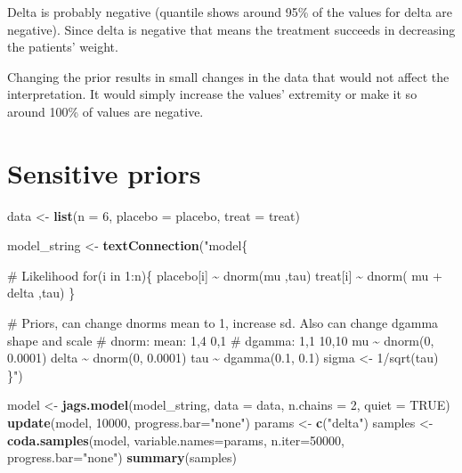 \documentclass[
]{article}
\newenvironment{Shaded}{\begin{snugshade}}{\end{snugshade}}
\newcommand{\AttributeTok}[1]{\textcolor[rgb]{0.13,0.29,0.53}{#1}}
\newcommand{\ConstantTok}[1]{\textcolor[rgb]{0.56,0.35,0.01}{#1}}
\newcommand{\DecValTok}[1]{\textcolor[rgb]{0.00,0.00,0.81}{#1}}
\newcommand{\FunctionTok}[1]{\textcolor[rgb]{0.13,0.29,0.53}{\textbf{#1}}}
\newcommand{\NormalTok}[1]{#1}
\newcommand{\OtherTok}[1]{\textcolor[rgb]{0.56,0.35,0.01}{#1}}
\newcommand{\StringTok}[1]{\textcolor[rgb]{0.31,0.60,0.02}{#1}}
\begin{document}
Delta is probably negative (quantile shows around 95\% of the values for
delta are negative). Since delta is negative that means the treatment
succeeds in decreasing the patients' weight.

Changing the prior results in small changes in the data that would not
affect the interpretation. It would simply increase the values'
extremity or make it so around 100\% of values are negative.

\section{Sensitive priors}\label{sensitive-priors}

\begin{Shaded}
\begin{Highlighting}[]
\NormalTok{  data }\OtherTok{\textless{}{-}} \FunctionTok{list}\NormalTok{(}\AttributeTok{n =} \DecValTok{6}\NormalTok{, }\AttributeTok{placebo =}\NormalTok{ placebo, }\AttributeTok{treat =}\NormalTok{ treat)}

\NormalTok{  model\_string }\OtherTok{\textless{}{-}} \FunctionTok{textConnection}\NormalTok{(}\StringTok{"model\{}

\StringTok{   \# Likelihood}
\StringTok{   for(i in 1:n)\{}
\StringTok{     placebo[i] \textasciitilde{} dnorm(mu ,tau)}
\StringTok{     treat[i] \textasciitilde{} dnorm( mu + delta ,tau)}
\StringTok{   \}}

\StringTok{   \# Priors, can change dnorms mean to 1, increase sd. Also can change dgamma shape and scale}
\StringTok{   \# dnorm: mean: 1,4 0,1}
\StringTok{   \# dgamma: 1,1 10,10}
\StringTok{   mu    \textasciitilde{}  dnorm(0, 0.0001)}
\StringTok{   delta \textasciitilde{}  dnorm(0, 0.0001)}
\StringTok{   tau   \textasciitilde{}  dgamma(0.1, 0.1)}
\StringTok{   sigma \textless{}{-} 1/sqrt(tau)}
\StringTok{ \}"}\NormalTok{)}
 
\NormalTok{ model }\OtherTok{\textless{}{-}} \FunctionTok{jags.model}\NormalTok{(model\_string, }\AttributeTok{data =}\NormalTok{ data, }\AttributeTok{n.chains =} \DecValTok{2}\NormalTok{, }\AttributeTok{quiet =} \ConstantTok{TRUE}\NormalTok{)}
 \FunctionTok{update}\NormalTok{(model, }\DecValTok{10000}\NormalTok{, }\AttributeTok{progress.bar=}\StringTok{"none"}\NormalTok{)}
\NormalTok{ params  }\OtherTok{\textless{}{-}} \FunctionTok{c}\NormalTok{(}\StringTok{"delta"}\NormalTok{)}
\NormalTok{ samples }\OtherTok{\textless{}{-}} \FunctionTok{coda.samples}\NormalTok{(model, }
            \AttributeTok{variable.names=}\NormalTok{params, }
            \AttributeTok{n.iter=}\DecValTok{50000}\NormalTok{, }\AttributeTok{progress.bar=}\StringTok{"none"}\NormalTok{)}
 \FunctionTok{summary}\NormalTok{(samples)}
\end{Highlighting}
\end{Shaded}
\end{document}
